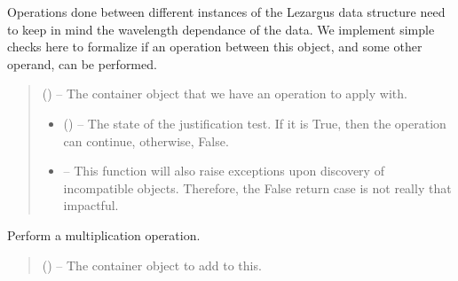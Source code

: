 \documentclass[letterpaper,11pt,english]{sphinxmanual}
\begin{document}
\begin{savenotes}
\begin{fulllineitems}
\begin{savenotes}
\begin{fulllineitems}
\sphinxAtStartPar
Operations done between different instances of the Lezargus data
structure need to keep in mind the wavelength dependance of the data.
We implement simple checks here to formalize if an operation between
this object, and some other operand, can be performed.
\begin{quote}\begin{description}
\sphinxAtStartPar
{} () – The container object that we have an operation to apply with.

\sphinxAtStartPar
\begin{itemize}
\item {} 
\sphinxAtStartPar
{} () – The state of the justification test. If it is True, then the
operation can continue, otherwise, False.

\item {} 
\sphinxAtStartPar
{} – This function will also raise exceptions upon discovery of
incompatible objects. Therefore, the False return case is not
really that impactful.

\end{itemize}


\end{description}\end{quote}

\end{fulllineitems}\end{savenotes}


\begin{savenotes}\begin{fulllineitems}
\label{\detokenize{code/lezargus.container.parent:lezargus.container.parent.LezargusContainerArithmetic.__mul__}}
\pysigstartsignatures
{}
\pysigstopsignatures
\sphinxAtStartPar
Perform a multiplication operation.
\begin{quote}\begin{description}
\sphinxAtStartPar
{} () – The container object to add to this.


\end{description}
\end{quote}
\end{fulllineitems}
\end{savenotes}
\end{fulllineitems}
\end{savenotes}
\end{document}
